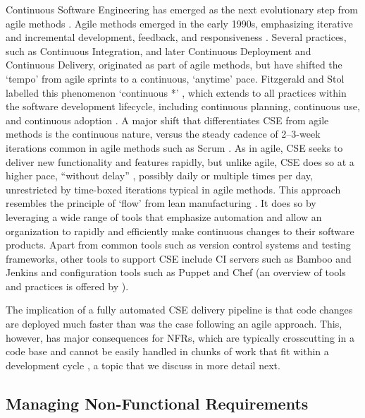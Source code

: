 \documentclass[smallextended]{svjour3}       %
\begin{document}
Continuous Software Engineering has emerged as the next evolutionary step from agile methods \citep{fitzgerald2017continuous,klotins2023continuous,bosch2014continuous}. Agile methods emerged in the early 1990s, emphasizing iterative and incremental development, feedback, and responsiveness \citep{tkalich2025user}. 
Several practices, such as Continuous Integration, and later Continuous Deployment and Continuous Delivery, originated as part of agile methods, but have shifted the `tempo' from agile sprints to a continuous, `anytime' pace. Fitzgerald and Stol labelled this phenomenon `continuous *' \citep{fitzgerald2017continuous}, which extends to all practices within the software development lifecycle, including continuous planning, continuous use, and continuous adoption \citep{barbala2024hicss}. 
A major shift that differentiates CSE from agile methods is the continuous nature, versus the steady cadence of 2--3-week iterations common in agile methods such as Scrum \citep{fitzgerald2017continuous,klotins2023continuous,tkalich2025user}. As in agile, CSE seeks to deliver new functionality and features rapidly, but unlike agile, CSE does so at a higher pace, ``without delay'' \citep{klotins2023continuous}, possibly daily or multiple times per day, unrestricted by time-boxed iterations typical in agile methods.
This approach resembles the principle of `flow' from lean manufacturing \citep{fitzgerald2017continuous}.
It does so by leveraging a wide range of tools that emphasize automation and allow an organization to rapidly and efficiently make continuous changes to their software products. Apart from common tools such as version control systems and testing frameworks, other tools to support CSE include CI servers such as Bamboo and Jenkins and configuration tools such as Puppet and Chef (an overview of tools and practices is offered by \citet{shahin2017continuous}). 

The implication of a fully automated CSE delivery pipeline is that code changes are deployed much faster than was the case following an agile approach. 
This, however, has major consequences for NFRs, which are typically crosscutting in a code base and cannot be easily handled in chunks of work that fit within a development cycle \citep{bellomo_evolutionary_2014}, a topic that we discuss in more detail next.




\subsection{Managing Non-Functional Requirements}
\label{sec:nfr}
\end{document}
